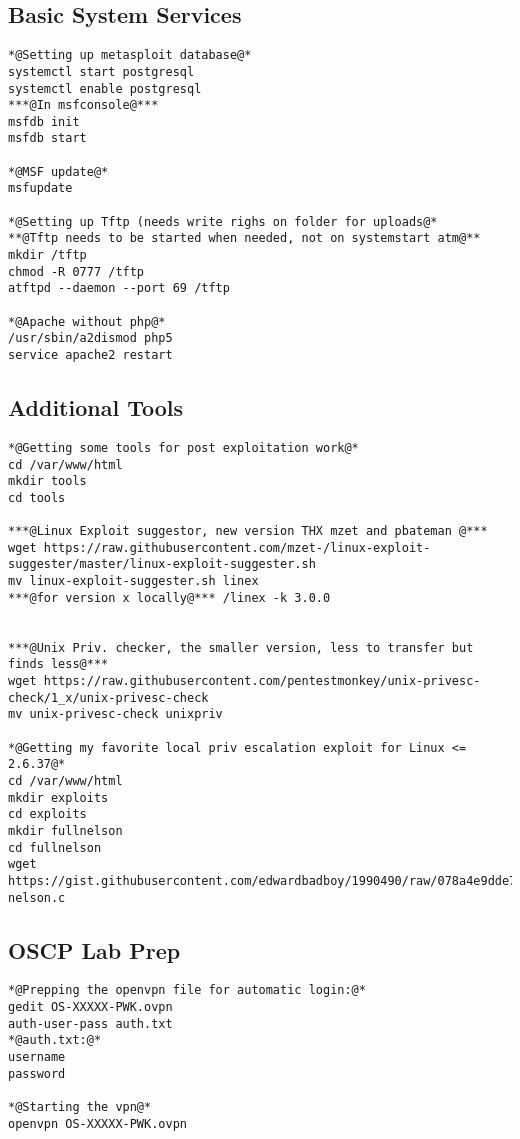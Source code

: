\documentclass[a4paper,12pt, twoside,]{report}
\begin{document}
\subsection{Basic System Services}
\begin{lstlisting}[caption={Prepping a fresh KaliVM-2- Setting up basic Services},label=Kaliprep2]
*@Setting up metasploit database@*
systemctl start postgresql
systemctl enable postgresql
***@In msfconsole@***
msfdb init
msfdb start

*@MSF update@*
msfupdate

*@Setting up Tftp (needs write righs on folder for uploads@*
**@Tftp needs to be started when needed, not on systemstart atm@**
mkdir /tftp
chmod -R 0777 /tftp
atftpd --daemon --port 69 /tftp

*@Apache without php@*
/usr/sbin/a2dismod php5
service apache2 restart

\end{lstlisting}
\newpage
\subsection{Additional Tools}
\begin{lstlisting}[caption={Prepping a fresh KaliVM-3 - Getting Tools},label=Kaliprep3]
*@Getting some tools for post exploitation work@*
cd /var/www/html
mkdir tools
cd tools

***@Linux Exploit suggestor, new version THX mzet and pbateman @***
wget https://raw.githubusercontent.com/mzet-/linux-exploit-suggester/master/linux-exploit-suggester.sh
mv linux-exploit-suggester.sh linex
***@for version x locally@*** /linex -k 3.0.0


***@Unix Priv. checker, the smaller version, less to transfer but finds less@***
wget https://raw.githubusercontent.com/pentestmonkey/unix-privesc-check/1_x/unix-privesc-check
mv unix-privesc-check unixpriv

*@Getting my favorite local priv escalation exploit for Linux <= 2.6.37@*
cd /var/www/html
mkdir exploits
cd exploits
mkdir fullnelson
cd fullnelson
wget https://gist.githubusercontent.com/edwardbadboy/1990490/raw/078a4e9dde71b915b018d1bf5aa532d035185616/full-nelson.c
\end{lstlisting}
\subsection{OSCP Lab Prep}
\begin{lstlisting}[caption={Prepping a fresh KaliVM-4- OSCP SSH Prep},label=Kaliprep4]
*@Prepping the openvpn file for automatic login:@*
gedit OS-XXXXX-PWK.ovpn
auth-user-pass auth.txt
*@auth.txt:@*
username
password

*@Starting the vpn@*
openvpn OS-XXXXX-PWK.ovpn
\end{lstlisting}
\end{document}
